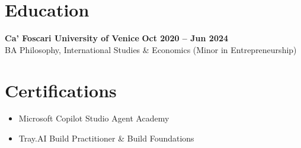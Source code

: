 \documentclass[10pt,a4paper]{article}
\begin{document}
\section*{Education}
\textbf{Ca' Foscari University of Venice} \hfill \textbf{Oct 2020 -- Jun 2024} \\
BA Philosophy, International Studies \& Economics (Minor in Entrepreneurship)

\section*{Certifications}
\begin{itemize}[leftmargin=0.15in, itemsep=0pt]
    \item Microsoft Copilot Studio Agent Academy
    \item Tray.AI Build Practitioner \& Build Foundations
\end{itemize}
\end{document}
